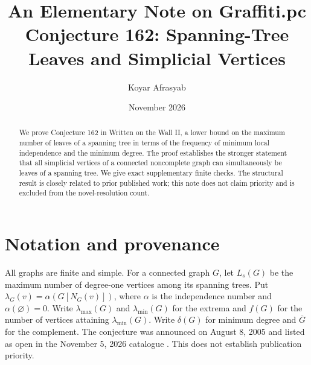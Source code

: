 \documentclass[11pt]{article}
\title{An Elementary Note on Graffiti.pc Conjecture 162: Spanning-Tree Leaves and Simplicial Vertices}
\author{Koyar Afrasyab}
\date{November 2026}
\begin{document}
\maketitle
\begin{abstract}
We prove Conjecture 162 in Written on the Wall II, a lower bound on the maximum number of leaves of a spanning tree in terms of the frequency of minimum local independence and the minimum degree. The proof establishes the stronger statement that all simplicial vertices of a connected noncomplete graph can simultaneously be leaves of a spanning tree. We give exact supplementary finite checks. The structural result is closely related to prior published work; this note does not claim priority and is excluded from the novel-resolution count.
\end{abstract}
\section{Notation and provenance}
All graphs are finite and simple. For a connected graph $G$, let $L_s(G)$ be the maximum number of degree-one vertices among its spanning trees. Put $\lambda_G(v)=\alpha(G[N_G(v)])$, where $\alpha$ is the independence number and $\alpha(\varnothing)=0$. Write $\lambda_{\max}(G)$ and $\lambda_{\min}(G)$ for the extrema and $f(G)$ for the number of vertices attaining $\lambda_{\min}(G)$. Write $\delta(G)$ for minimum degree and $\overline G$ for the complement. The conjecture was announced on August 8, 2005 and listed as open in the November 5, 2026 catalogue \cite{wow}. This does not establish publication priority.
\end{document}
